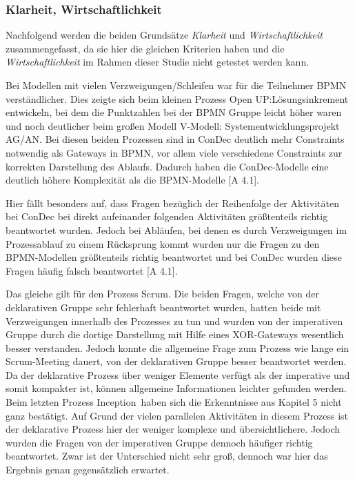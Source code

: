 \subsubsection{Klarheit, Wirtschaftlichkeit}



Nachfolgend werden die beiden Grundsätze \textit{Klarheit} und \textit{Wirtschaftlichkeit} zusammengefasst, da sie hier die gleichen Kriterien haben und die \textit{Wirtschaftlichkeit} im Rahmen dieser Studie nicht getestet werden kann.\newline

Bei Modellen mit  vielen Verzweigungen/Schleifen war für die Teilnehmer BPMN verständlicher. Dies zeigte sich beim kleinen Prozess \grqq Open UP:Lösungsinkrement entwickeln\grqq, bei dem die Punktzahlen bei der BPMN Gruppe leicht höher waren und noch deutlicher beim großen Modell \grqq V-Modell: Systementwicklungsprojekt AG/AN\grqq. Bei diesen beiden Prozessen sind in ConDec deutlich mehr Constraints notwendig als Gateways in BPMN, vor allem viele verschiedene Constraints zur korrekten Darstellung des Ablaufs. Dadurch haben die ConDec-Modelle eine deutlich höhere Komplexität als die BPMN-Modelle [A 4.1].\newline

Hier fällt besonders auf, dass Fragen bezüglich der Reihenfolge der Aktivitäten bei ConDec bei direkt aufeinander folgenden Aktivitäten größtenteils richtig beantwortet wurden. Jedoch bei Abläufen, bei denen es durch Verzweigungen im Prozessablauf zu einem Rücksprung kommt wurden nur die Fragen zu den BPMN-Modellen größtenteils richtig beantwortet und bei ConDec wurden diese Fragen häufig falsch beantwortet [A 4.1].\newline

Das gleiche gilt für den Prozess \grqq Scrum\grqq. Die beiden Fragen, welche von der deklarativen Gruppe sehr fehlerhaft beantwortet wurden, hatten beide mit Verzweigungen innerhalb des Prozesses zu tun und wurden von der imperativen Gruppe durch die dortige Darstellung mit Hilfe eines XOR-Gateways wesentlich besser verstanden. Jedoch konnte die allgemeine Frage zum Prozess wie lange ein Scrum-Meeting dauert, von der deklarativen Gruppe besser beantwortet werden. Da der deklarative Prozess über weniger Elemente verfügt als der imperative und  somit kompakter ist, können allgemeine Informationen leichter gefunden werden. \newline
Beim letzten Prozess \grqq Inception\grqq \ haben sich die Erkenntnisse aus Kapitel 5 nicht ganz bestätigt. Auf Grund der vielen parallelen Aktivitäten in diesem Prozess ist der deklarative Prozess hier der weniger komplexe und übersichtlichere. Jedoch wurden die Fragen von der imperativen Gruppe dennoch häufiger richtig beantwortet. Zwar ist der Unterschied nicht sehr groß, dennoch war hier das Ergebnis genau gegensätzlich erwartet.\newline

